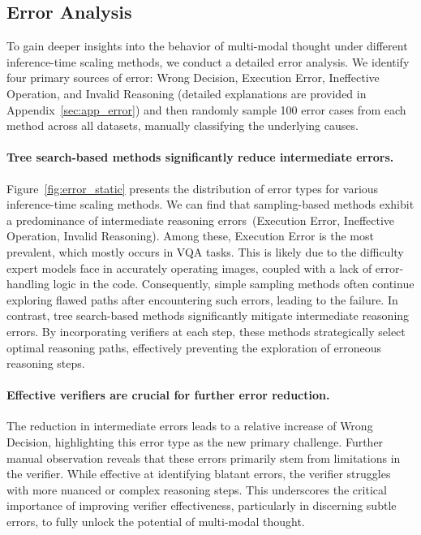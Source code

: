 \subsection{Error Analysis}

To gain deeper insights into the behavior of multi-modal thought under different inference-time scaling methods, we conduct a detailed error analysis. We identify four primary sources of error: Wrong Decision, Execution Error, Ineffective Operation, and Invalid Reasoning (detailed explanations are provided in Appendix~\ref{sec:app_error}) and then randomly sample 100 error cases from each method across all datasets, manually classifying the underlying causes.


\paragraph{Tree search-based methods significantly reduce intermediate errors.} \label{subsec:error_analysis}


Figure~\ref{fig:error_static} presents the distribution of error types for various inference-time scaling methods. We can find that sampling-based methods exhibit a predominance of intermediate reasoning errors~(Execution Error, Ineffective Operation, Invalid Reasoning).  Among these, Execution Error is the most prevalent, which mostly occurs in VQA tasks. This is likely due to the difficulty expert models face in accurately operating images, coupled with a lack of error-handling logic in the code.  Consequently, simple sampling methods often continue exploring flawed paths after encountering such errors, leading to the failure. In contrast, tree search-based methods significantly mitigate intermediate reasoning errors.  By incorporating verifiers at each step, these methods strategically select optimal reasoning paths, effectively preventing the exploration of erroneous reasoning steps.


\paragraph{Effective verifiers are crucial for further error reduction.}

The reduction in intermediate errors leads to a relative increase of Wrong Decision, highlighting this error type as the new primary challenge.  Further manual observation reveals that these errors primarily stem from limitations in the verifier. While effective at identifying blatant errors, the verifier struggles with more nuanced or complex reasoning steps.  This underscores the critical importance of improving verifier effectiveness, particularly in discerning subtle errors, to fully unlock the potential of multi-modal thought.


